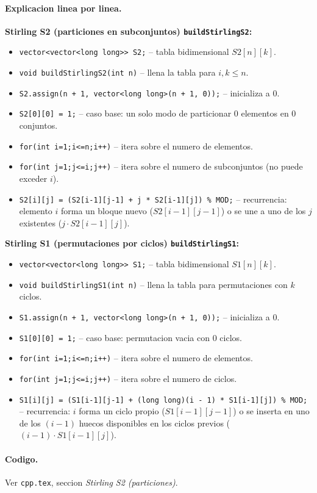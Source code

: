 \paragraph{Explicacion linea por linea.}
\textbf{Stirling S2 (particiones en subconjuntos) \texttt{buildStirlingS2}:}
\begin{itemize}\setlength\itemsep{0pt}
	\item \verb|vector<vector<long long>> S2;| -- tabla bidimensional $S2[n][k]$.
	\item \verb|void buildStirlingS2(int n)| -- llena la tabla para $i, k \le n$.
	\item \verb|S2.assign(n + 1, vector<long long>(n + 1, 0));| -- inicializa a $0$.
	\item \verb|S2[0][0] = 1;| -- caso base: un solo modo de particionar $0$ elementos en $0$ conjuntos.
	\item \verb|for(int i=1;i<=n;i++)| -- itera sobre el numero de elementos.
	\item \verb|for(int j=1;j<=i;j++)| -- itera sobre el numero de subconjuntos (no puede exceder $i$).
	\item \verb|S2[i][j] = (S2[i-1][j-1] + j * S2[i-1][j]) % MOD;| -- recurrencia: elemento $i$ forma un bloque nuevo ($S2[i-1][j-1]$) o se une a uno de los $j$ existentes ($j \cdot S2[i-1][j]$).
\end{itemize}
\textbf{Stirling S1 (permutaciones por ciclos) \texttt{buildStirlingS1}:}
\begin{itemize}\setlength\itemsep{0pt}
	\item \verb|vector<vector<long long>> S1;| -- tabla bidimensional $S1[n][k]$.
	\item \verb|void buildStirlingS1(int n)| -- llena la tabla para permutaciones con $k$ ciclos.
	\item \verb|S1.assign(n + 1, vector<long long>(n + 1, 0));| -- inicializa a $0$.
	\item \verb|S1[0][0] = 1;| -- caso base: permutacion vacia con $0$ ciclos.
	\item \verb|for(int i=1;i<=n;i++)| -- itera sobre el numero de elementos.
	\item \verb|for(int j=1;j<=i;j++)| -- itera sobre el numero de ciclos.
	\item \verb|S1[i][j] = (S1[i-1][j-1] + (long long)(i - 1) * S1[i-1][j]) % MOD;| -- recurrencia: $i$ forma un ciclo propio ($S1[i-1][j-1]$) o se inserta en uno de los $(i-1)$ huecos disponibles en los ciclos previos ($(i-1) \cdot S1[i-1][j]$).
\end{itemize}

\paragraph{Codigo.}
Ver \texttt{cpp.tex}, seccion \textit{Stirling S2 (particiones)}.

\vspace{0.5em|||}
